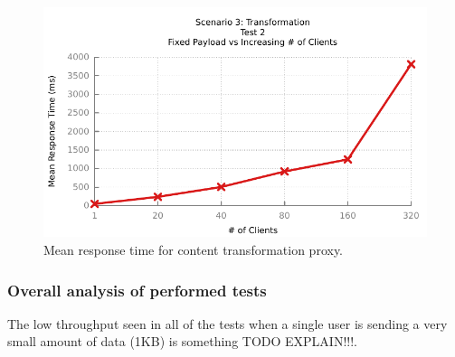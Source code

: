 \begin{figure}[htpb]
	\centerline{\includegraphics{img/transform_fp_iu_resp}}
	\caption{Mean response time for content transformation proxy.}
	\label{fig:transform-2-2}
\end{figure}

\subsubsection{Overall analysis of performed tests}
\label{sec:test-final-analysis}

The low throughput seen in all of the tests when a single user is sending a very small amount of data (1KB) is something TODO EXPLAIN!!!.
